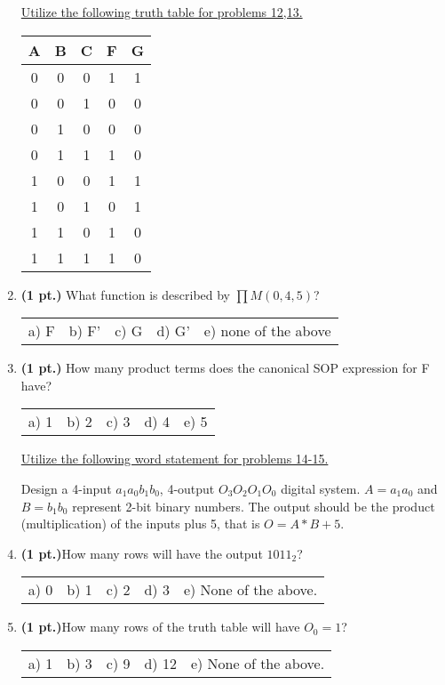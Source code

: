 \documentclass{article}
\begin{document}
\begin{enumerate}
\underline{Utilize the following truth table for problems 12,13.}

\begin{tabular}{c|c|c||c|c}
A & B & C & F & G  \\ \hline \hline
0 & 0 & 0 & 1 & 1  \\ \hline
0 & 0 & 1 & 0 & 0  \\ \hline
0 & 1 & 0 & 0 & 0  \\ \hline
0 & 1 & 1 & 1 & 0  \\ \hline
1 & 0 & 0 & 1 & 1  \\ \hline
1 & 0 & 1 & 0 & 1  \\ \hline
1 & 1 & 0 & 1 & 0  \\ \hline
1 & 1 & 1 & 1 & 0  \\
\end{tabular} 

\item {\bf (1 pt.)} What function is described by $\prod M(0,4,5)$?

\begin{tabular}{p{0.7in} p{0.7in} p{0.7in} p{0.7in} l}
a) F & b) F' & c) G & d) G' & e) none of the above
\end{tabular}


\item {\bf (1 pt.)} How many product terms does the canonical SOP expression 
for F have?

\begin{tabular}{p{0.7in} p{0.7in} p{0.7in} p{0.7in} l}
a) 1 & b) 2 & c) 3 & d) 4 & e) 5
\end{tabular}

\underline{Utilize the following word statement for problems 14-15.}

Design a 4-input $a_1a_0b_1b_0$, 4-output 
$O_3O_2O_1O_0$ digital system.  $A=a_1a_0$ and $B=b_1b_0$ represent 
2-bit binary numbers.  The output should be the product (multiplication) 
of the inputs plus 5, that is $O=A*B+5$. 

\item {\bf (1 pt.)}How many rows will have the output $1011_2$?

\begin{tabular}{p{0.7in} p{0.7in} p{0.7in} p{0.7in} l}
a) 0 & b) 1 & c) 2 & d) 3 & e) None of the above.
\end{tabular}

\item {\bf (1 pt.)}How many rows of the truth table will have $O_0 = 1$?

\begin{tabular}{p{0.7in} p{0.7in} p{0.7in} p{0.7in} l}
a) 1 & b) 3 & c) 9 & d) 12 & e) None of the above.
\end{tabular}


\end{enumerate}
\end{document}
